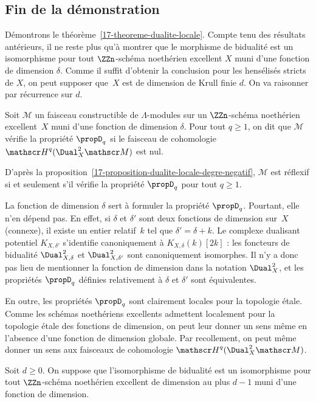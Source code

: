 \documentclass[10pt]{../fichiers-configuration-latex/smfart}
\begin{document}
\subsection{Fin de la démonstration}%

Démontrons le théorème~\ref{17-theoreme-dualite-locale}. Compte tenu des
résultats antérieurs, il ne reste plus qu'à montrer que le morphisme de
bidualité est un isomorphisme pour tout $\ZZn$-schéma noethérien excellent
$X$ muni d'une fonction de dimension $\delta$. Comme il suffit d'obtenir la
conclusion pour les hensélisés stricts de $X$, on peut supposer que $X$ est
de dimension de Krull finie $d$. On va raisonner par récurrence sur $d$.

\begin{definition2}
Soit $\mathscr M$ un faisceau constructible de $\Lambda$-modules sur un
$\ZZn$-schéma noethérien excellent $X$ muni d'une fonction de dimension
$\delta$. Pour tout $q\geq 1$, on dit que $\mathscr M$ vérifie la propriété
$\propD_q$ si le faisceau de cohomologie ${\mathscr H}^q(\Dual_X^2\mathscr
M)$ est nul.
\end{definition2}

D'après la proposition~\ref{17-proposition-dualite-locale-degre-negatif}, 
$\mathscr M$ est réflexif si et seulement s'il vérifie la propriété
$\propD_q$ pour tout $q\geq 1$.

La fonction de dimension $\delta$ sert à formuler la
propriété $\propD_q$. Pourtant, elle n'en dépend pas. En effet, si $\delta$
et $\delta'$ sont deux fonctions de dimension sur $X$ (connexe), il existe
un entier relatif $k$ tel que $\delta'=\delta+k$. Le complexe dualisant
potentiel $K_{X,\delta'}$ s'identifie canoniquement à
$K_{X,\delta}(k)[2k]$ : les foncteurs de bidualité $\Dual_{X,\delta}^2$ et
$\Dual_{X,\delta'}^2$ sont canoniquement isomorphes. Il n'y a donc pas lieu
de mentionner la fonction de dimension dans la notation $\Dual_X^2$, et les
propriétés $\propD_q$ définies relativement à $\delta$ et $\delta'$
sont équivalentes.

En outre, les propriétés $\propD_q$ sont clairement locales pour la
topologie étale. Comme les schémas noethériens excellents admettent
localement pour la topologie étale des fonctions de dimension, on peut leur
donner un sens même en l'absence d'une fonction de dimension globale. Par
recollement, on peut même donner un sens aux faisceaux de cohomologie
${\mathscr H}^q(\Dual_X^2\mathscr M)$.

\medskip

Soit $d\geq 0$. On suppose que l'isomorphisme de bidualité est un
isomorphisme pour tout $\ZZn$-schéma noethérien excellent de dimension au
plus $d-1$ muni d'une fonction de dimension. 
\end{document}
